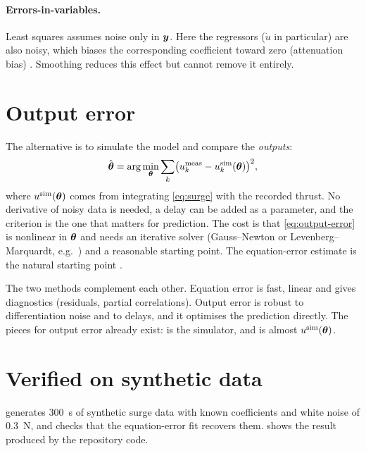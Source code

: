 \paragraph{Errors-in-variables.} Least squares assumes noise only in $\boldsymbol{y}$. Here the
regressors ($\dot u$ in particular) are also noisy, which biases the corresponding coefficient
toward zero (attenuation bias) \cite{greene2012}. Smoothing reduces this effect but cannot remove it entirely.

\section{Output error}
\label{sec:output-error}

The alternative is to simulate the model and compare the \emph{outputs}:
\begin{equation}
  \hat{\boldsymbol{\theta}} = \arg\min_{\boldsymbol{\theta}} \sum_k \bigl(u^\mathrm{meas}_k - u^\mathrm{sim}_k(\boldsymbol{\theta})\bigr)^2,
  \label{eq:output-error}
\end{equation}
where $u^\mathrm{sim}(\boldsymbol{\theta})$ comes from integrating \eqref{eq:surge} with the recorded
thrust. No derivative of noisy data is needed, a delay can be added as a parameter, and the
criterion is the one that matters for prediction. The cost is that \eqref{eq:output-error} is
nonlinear in $\boldsymbol{\theta}$ and needs an iterative solver (Gauss--Newton or
Levenberg--Marquardt, e.g.\ ) and a reasonable starting
point. The equation-error estimate is the natural starting point \cite{klein2006}.

\begin{keyidea}
The two methods complement each other. Equation error is fast, linear and gives
diagnostics (residuals, partial correlations). Output error is robust to differentiation
noise and to delays, and it optimises the prediction directly. The pieces for output error
already exist:  is the simulator, and  is almost
$u^\mathrm{sim}(\boldsymbol{\theta})$.
\end{keyidea}

\section{Verified on synthetic data}

 generates \qty{300}{\second} of synthetic surge data with
known coefficients and white noise of \qty{0.3}{\newton}, and checks that the equation-error fit
recovers them.  shows the result produced by the repository code.

